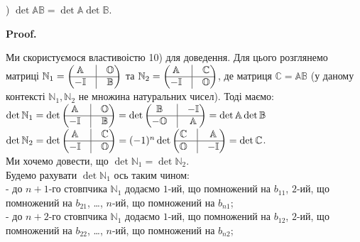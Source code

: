 \documentclass[a4paper, 10pt]{article}
\makeatletter
\theoremstyle{theoremdd}
\renewenvironment{proof}[1][Proof.\\]{\par
\pushQED{\hfill \qed}%
\normalfont \topsep6\p@\@plus6\p@\relax
\trivlist
\item\relax
{\bfseries
#1\@addpunct{.}}\hspace\labelsep\ignorespaces
}{%
\popQED\endtrivlist\@endpefalse
}
\makeatother
\begin{document}
) $\det \mathbb{A} \mathbb{B} = \det \mathbb{A} \det \mathbb{B}$.

\begin{proof}
Ми скористуємося властивоістю 10) для доведення. Для цього розглянемо матриці $\mathbb{N}_1 = \begin{pmatrix}
 \mathbb{A} & \vline & \mathbb{O} \\
 \hline
 -\mathbb{I} & \vline & \mathbb{B}
\end{pmatrix}$ та $\mathbb{N}_2 = \begin{pmatrix}
 \mathbb{A} & \vline & \mathbb{C} \\
 \hline
 -\mathbb{I} & \vline & \mathbb{O}
\end{pmatrix}$, де матриця $\mathbb{C} = \mathbb{A} \mathbb{B}$ (у даному контексті $\mathbb{N}_1, \mathbb{N}_2$ не множина натуральних чисел). Тоді маємо:\\
$\det \mathbb{N}_1 = \det \begin{pmatrix}
 \mathbb{A} & \vline & \mathbb{O} \\
 \hline
 -\mathbb{I} & \vline & \mathbb{B}
\end{pmatrix} = \det \begin{pmatrix}
 \mathbb{B} & \vline & -\mathbb{I} \\
 \hline
 -\mathbb{O} & \vline & \mathbb{A}
\end{pmatrix} = \det \mathbb{A} \det \mathbb{B}$ \\ $\det \mathbb{N}_2 = \det \begin{pmatrix}
 \mathbb{A} & \vline & \mathbb{C} \\
 \hline
 -\mathbb{I} & \vline & \mathbb{O}
\end{pmatrix} = (-1)^n \det \begin{pmatrix}
 \mathbb{C} & \vline & \mathbb{A} \\
 \hline
 \mathbb{O} & \vline & -\mathbb{I}
\end{pmatrix} = \det \mathbb{C}$.\\
Ми хочемо довести, що $\det \mathbb{N}_1 = \det \mathbb{N}_2$.\\
Будемо рахувати $\det \mathbb{N}_1$ ось таким чином:\\
- до $n+1$-го стовпчика $\mathbb{N}_1$ додаємо $1$-ий, що помножений на $b_{11}$, $2$-ий, що помножений на $b_{21}$, \dots , $n$-ий, що помножений на $b_{n1}$;\\
- до $n+2$-го стовпчика $\mathbb{N}_1$ додаємо $1$-ий, що помножений на $b_{12}$, $2$-ий, що помножений на $b_{22}$, \dots , $n$-ий, що помножений на $b_{n2}$;\\

\end{proof}
\end{document}
